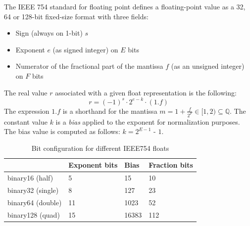 The IEEE 754 standard for floating point \cite{893287} defines a floating-point value as a 32, 64 or 128-bit fixed-size format with three fields:
\begin{itemize}
    \item Sign (always on 1-bit) $s$
    \item Exponent $e$ (as signed integer) on $E$ bits
    \item Numerator of the fractional part of the mantissa $f$ (as an unsigned integer) on $F$ bits
\end{itemize}
The real value $r$ associated with a given float representation is the following:
\begin{equation}\label{eqn:float2real}
    r = (-1)^s \cdot 2^{e-k} \cdot (1.f)
\end{equation}
The expression $1.f$ is a shorthand for the mantissa $m = 1 + \frac{f}{2^F} \in [1,2) \subseteq \mathbb{Q}$.
The constant value $k$ is a \textit{bias} applied to the exponent for normalization purposes. The bias value is computed as follows: $k = 2^{E-1}$ - $1$.



\begin{table}[b]
\centering
\caption{Bit configuration for different IEEE754 floats}
\label{tab:ieee754configs}
\begin{tabular}{l|lll}
\hline
          & Exponent bits & Bias  & Fraction bits \\ \hline
binary16 (half) &  5             & 15    & 10            \\ \hline
binary32 (single) & 8             & 127   & 23            \\ \hline
binary64 (double) & 11            & 1023  & 52            \\ \hline
binary128 (quad) & 15            & 16383 & 112           \\ \hline
\end{tabular}
\end{table}

